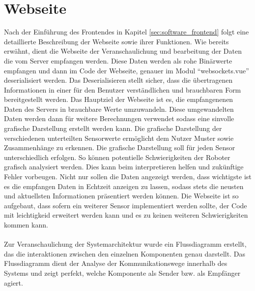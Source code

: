 \section{Webseite}
\label{subsec:frontend_Webseite}
Nach der Einführung des Frontendes in Kapitel \ref{sec:software_frontend} folgt eine detaillierte
Beschreibung der Webseite sowie ihrer Funktionen. 
%
Wie bereits erwähnt, dient die Webseite der Veranschaulichung 
und bearbeitung der Daten die vom Server empfangen werden. 
%
Diese Daten werden als rohe Binärwerte empfangen und dann im Code der Webseite,
genauer im Modul ``websockets.vue'' deserialisiert werden. 
Das Deserialisieren stellt sicher, dass die übertragenen Informationen in einer für den Benutzer 
verständlichen und brauchbaren Form bereitgestellt werden. 
%
Das Hauptziel der Webseite ist es, die empfangenenen Daten des Servers in brauchbare Werte umzuwandeln. 
Diese umgewandelten Daten werden dann für weitere Berechnungen verwendet sodass eine sinvolle grafische Darstellung
erstellt werden kann.
%
Die grafische Darstellung der verschiedenen unterteilten Sensorwerte ermöglicht dem Nutzer Muster sowie 
Zusammenhänge zu erkennen. 
%
Die grafische Darstellung soll für jeden Sensor unterschiedlich erfolgen. So können potentielle Schwierigkeiten 
der Roboter grafisch analysiert werden. Dies kann beim interpretieren helfen und zukünftige Fehler vorbeugen. 
%
Nicht nur sollen die Daten angezeigt werden, dass wichtigste ist es die empfangen Daten 
in Echtzeit anzeigen zu lassen, sodass stets die neusten und aktuellsten Informationen präsentiert werden können.
%
Die Webseite ist so aufgebaut, dass sofern ein weiterer Sensor implementiert werden sollte, 
der Code mit leichtigkeid erweitert werden kann und es zu keinen weiteren Schwierigkeiten kommen kann.  
\\ \\
Zur Veranschaulichung der Systemarchitektur wurde ein Flussdiagramm erstellt, 
das die interaktionen zwischen den einzelnen Komponenten genau darstellt.
Das Flussdiagramm dient der Analyse der Kommunikationswege innerhalb des Systems und
zeigt perfekt, welche Komponente als Sender bzw. als Empfänger agiert. 
%
